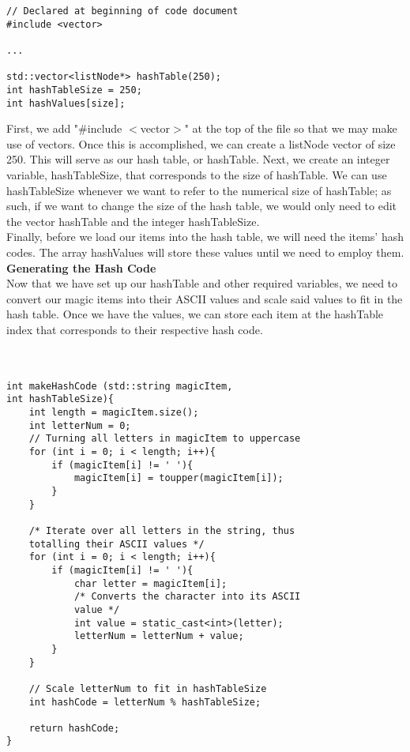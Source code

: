 \documentclass{article}
\begin{document}
\begin{lstlisting}
// Declared at beginning of code document
#include <vector>

...

std::vector<listNode*> hashTable(250);
int hashTableSize = 250;
int hashValues[size];
\end{lstlisting}

First, we add "\#include $<$vector$>$" at the top of the file so that we may make use of vectors. Once this is accomplished, we can create a listNode vector of size 250. This will serve as our hash table, or hashTable. Next, we create an integer variable, hashTableSize, that corresponds to the size of hashTable. We can use hashTableSize whenever we want to refer to the numerical size of hashTable; as such, if we want to change the size of the hash table, we would only need to edit the vector hashTable and the integer hashTableSize. \\
Finally, before we load our items into the hash table, we will need the items' hash codes. The array hashValues will store these values until we need to employ them. \\


\textbf{Generating the Hash Code} \\
Now that we have set up our hashTable and other required variables, we need to convert our magic items into their ASCII values and scale said values to fit in the hash table. Once we have the values, we can store each item at the hashTable index that corresponds to their respective hash code. \\ \\ \\

\begin{lstlisting}
int makeHashCode (std::string magicItem, 
int hashTableSize){
    int length = magicItem.size();
    int letterNum = 0;
    // Turning all letters in magicItem to uppercase
    for (int i = 0; i < length; i++){
        if (magicItem[i] != ' '){
            magicItem[i] = toupper(magicItem[i]);
        }
    }

    /* Iterate over all letters in the string, thus 
    totalling their ASCII values */
    for (int i = 0; i < length; i++){
        if (magicItem[i] != ' '){ 
            char letter = magicItem[i];
            /* Converts the character into its ASCII 
            value */
            int value = static_cast<int>(letter);
            letterNum = letterNum + value;
        }
    }

    // Scale letterNum to fit in hashTableSize
    int hashCode = letterNum % hashTableSize; 

    return hashCode;
}
\end{lstlisting}
\end{document}
